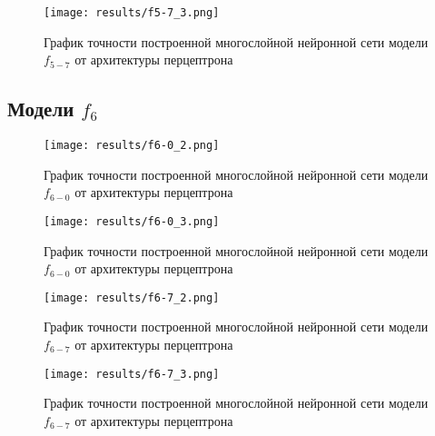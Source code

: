 \begin{figure}[H]
	\texttt{[image: results/f5-7\_3.png]}
	
	\caption{График точности построенной многослойной нейронной сети модели $f_{5-7}$ от архитектуры перцептрона}
\end{figure}


\subsection{Модели $f_{6}$}

\bigskip


\begin{figure}[H]
	\texttt{[image: results/f6-0\_2.png]}
	
	\caption{График точности построенной многослойной нейронной сети модели $f_{6-0}$ от архитектуры перцептрона}
	
\end{figure}


\begin{figure}[H]
	\texttt{[image: results/f6-0\_3.png]}
	
	\caption{График точности построенной многослойной нейронной сети модели $f_{6-0}$ от архитектуры перцептрона}	
\end{figure}



\bigskip


\begin{figure}[H]
	\texttt{[image: results/f6-7\_2.png]}
	
	\caption{График точности построенной многослойной нейронной сети модели $f_{6-7}$ от архитектуры перцептрона}
	
\end{figure}


\begin{figure}[H]
	\texttt{[image: results/f6-7\_3.png]}
	
\caption{График точности построенной многослойной нейронной сети модели $f_{6-7}$ от архитектуры перцептрона}
\end{figure}

